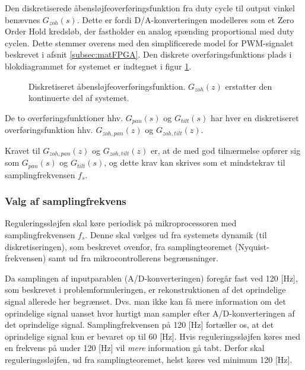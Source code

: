 Den diskretiserede åbensløjfeoverføringsfunktion fra duty cycle til output vinkel
benævnes \(G_{zoh}\left(s\right)\). Dette er fordi D/A-konverteringen modelleres som et Zero Order Hold kredsløb,
der fastholder en analog spænding proportional med duty cyclen. Dette stemmer overens med den simplificerede
model for PWM-signalet beskrevet i afsnit \ref{subsec:matFPGA}.
Den diskrete overføringsfunktions plads i blokdiagrammet for systemet
er indtegnet i figur \ref{fig:digitalkontroller3}.
\begin{figure}[!th]
\centering
\begin{tikzpicture}[scale=0.9, every node/.style={scale=0.9}, node distance=2.6cm, =>latex']

\end{tikzpicture}
\caption[Diskretiseret åbensløjfeoverføringsfunktion]
		{Diskretiseret åbensløjfeoverføringsfunktion.
		\(G_{zoh}\left(z\right)\) erstatter den kontinuerte del af systemet.}
\label{fig:digitalkontroller3}
\end{figure}
De to overføringsfunktioner hhv. \(G_{pan}\left(s\right)\) og \(G_{tilt}\left(s\right)\)
har hver en diskretiseret overføringsfunktion hhv. \(G_{zoh,pan}\left(z\right)\) og \(G_{zoh,tilt}\left(z\right)\).

Kravet til \(G_{zoh,pan}\left(z\right)\) og \(G_{zoh,tilt}\left(z\right)\) er, at de
med god tilnærmelse opfører sig som \(G_{pan}\left(s\right)\) og \(G_{tilt}\left(s\right)\),
og dette krav kan skrives som et mindstekrav til samplingfrekvensen \(f_s\).

\subsubsection{Valg af samplingfrekvens}\label{subsec:choosefs}
Reguleringssløjfen skal køre periodisk på mikroprocessoren
med samplingfrekvensen \(f_s\). Denne skal vælges
ud fra systemets dynamik (til diskretiseringen), som beskrevet ovenfor,
fra samplingteoremet (Nyquist-frekvensen) samt ud fra
mikrocontrollerens begrænsninger.

Da samplingen af inputparablen (A/D-konverteringen) foregår fast ved 120 [Hz],
som beskrevet i problemformuleringen, er rekonstruktionen
af det oprindelige signal allerede her begrænset. Dvs. man
ikke kan få mere information om det oprindelige signal
uanset hvor hurtigt man sampler efter A/D-konverteringen af
det oprindelige signal.
Samplingfrekvensen på 120 [Hz] fortæller os,
at det oprindelige signal kun er bevaret op til 60 [Hz].
Hvis reguleringssløjfen køres med en frekvens på under 120 [Hz]
vil \textit{mere} information gå tabt.
Derfor skal reguleringssløjfen, ud fra samplingteoremet, helst køres
ved minimum 120 [Hz].

